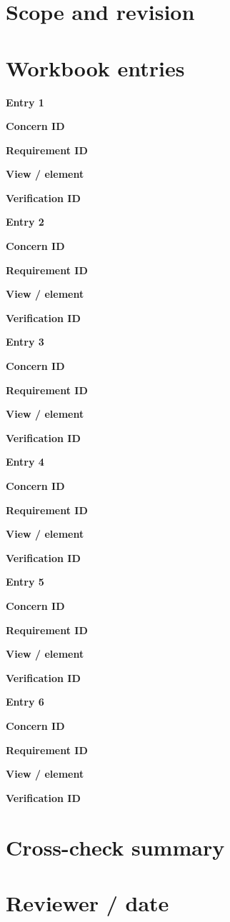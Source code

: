 \documentclass[10pt,letterpaper]{article}
\begin{document}
\DocProvenance
\section{Scope and revision}
\section{Workbook entries}
\textbf{Entry 1}\par
\textbf{Concern ID}\par{}
\textbf{Requirement ID}\par{}
\textbf{View / element}\par{}
\textbf{Verification ID}\par{}
\textbf{Entry 2}\par
\textbf{Concern ID}\par{}
\textbf{Requirement ID}\par{}
\textbf{View / element}\par{}
\textbf{Verification ID}\par{}
\textbf{Entry 3}\par
\textbf{Concern ID}\par{}
\textbf{Requirement ID}\par{}
\textbf{View / element}\par{}
\textbf{Verification ID}\par{}
\textbf{Entry 4}\par
\textbf{Concern ID}\par{}
\textbf{Requirement ID}\par{}
\textbf{View / element}\par{}
\textbf{Verification ID}\par{}
\textbf{Entry 5}\par
\textbf{Concern ID}\par{}
\textbf{Requirement ID}\par{}
\textbf{View / element}\par{}
\textbf{Verification ID}\par{}
\textbf{Entry 6}\par
\textbf{Concern ID}\par{}
\textbf{Requirement ID}\par{}
\textbf{View / element}\par{}
\textbf{Verification ID}\par{}
\section{Cross-check summary}
\section{Reviewer / date}
\end{document}
